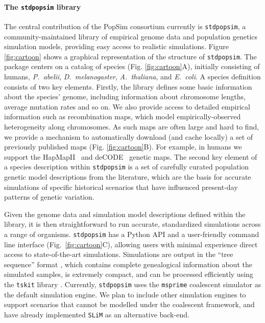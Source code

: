 \documentclass[12pt,halfline,a4paper]{ouparticle}
\newcommand{\stdpopsim}{\texttt{stdpopsim}\xspace}
\newcommand{\tskit}{\texttt{tskit}\xspace}
\begin{document}
\paragraph{The \stdpopsim library}
The central contribution of the PopSim consortium currently is \stdpopsim, a
community-maintained library of empirical genome data and population genetics simulation
models, providing easy access to realistic simulations. Figure \ref{fig:cartoon} shows a graphical
representation of the structure of \stdpopsim. The package centers
on a catalog of species (Fig. \ref{fig:cartoon}A), initially consisting of humans, \emph{P.~abelii},
\emph{D.~melanogaster}, \emph{A.~thaliana}, and \emph{E.~coli}.
A species definition consists of two key elements.  Firstly, the library defines
some basic information about the species' genome, including information about chromosome
lengths, average mutation rates and so on. We also provide access to detailed
empirical information such as recombination maps, which model empirically-observed
heterogeneity along chromosomes. As such maps are often large and hard
to find, we provide a mechanism to automatically download (and cache locally) a
set of previously published maps (Fig. \ref{fig:cartoon}B). For example, in humans we support the
HapMapII~\citep{international2007second} and
deCODE~\citep{kong2010fine} genetic maps. The second key element of a species description
within \stdpopsim is a set of carefully curated population genetic model
descriptions from the literature, which are the basis for accurate simulations
of specific historical scenarios that have influenced present-day patterns of
genetic variation.

Given the genome data and simulation model descriptions defined within the
library, it is then straightforward to run accurate, standardized simulations
across a range of organisms. \stdpopsim has a Python API and a user-friendly
command line interface (Fig.~\ref{fig:cartoon}C), allowing users with minimal experience direct access to
state-of-the-art simulations. Simulations are output in the “tree sequence”
format \citep{kelleher2016efficient,kelleher2018efficient,kelleher2019inferring}, which
contains complete genealogical information about the simulated samples, is
extremely compact, and can be processed efficiently using the \tskit library
\citep{kelleher2016efficient,kelleher2018efficient}. Currently,
\stdpopsim uses the  \texttt{msprime} coalescent simulator \citep{kelleher2016efficient}
as the default simulation engine. We plan to include other simulation
engines to support scenarios that cannot be modelled under the coalescent framework,
and have already implemented \texttt{SLiM} \citep{haller2019slim} as
an alternative back-end.
\end{document}
